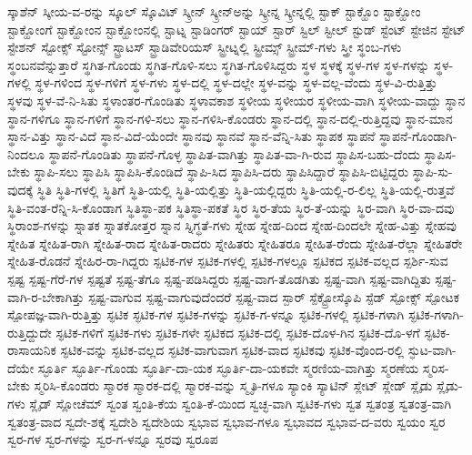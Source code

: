 {ಸ್ಕಾಶೆನ್
ಸ್ಕೀಯ-ವ-ರನ್ನು
ಸ್ಕೂಲ್
ಸ್ಕೊವಿಟ್
ಸ್ಕ್ರೀನ್
ಸ್ಕ್ರೀನ್ಅನ್ನು
ಸ್ಕ್ರೀನ್ನ
ಸ್ಕ್ರೀನ್ನಲ್ಲಿ
ಸ್ಟಾಕ್
ಸ್ಟಾಕ್ಹೊಂ
ಸ್ಟಾಕ್ಹೋಂ
ಸ್ಟಾಕ್ಹೋಂಗೆ
ಸ್ಟಾಕ್ಹೋಂನ
ಸ್ಟಾಕ್ಹೋಂನಲ್ಲಿ
ಸ್ಟಾಟ್ನ
ಸ್ಟಾಡಿಂಗರ್
ಸ್ಟಾಯ್
ಸ್ಟಾರ್
ಸ್ಟಿಲ್
ಸ್ಟೀಲ್
ಸ್ಟುಡ್
ಸ್ಟೆಂಟ್
ಸ್ಟೇಜಿನ
ಸ್ಟೇಟ್
ಸ್ಟೇಶನ್
ಸ್ಟೋಕ್ಸ್
ಸ್ಟೋನ್ಸ್
ಸ್ಟ್ರಾಟಸ್
ಸ್ಟ್ರಾಡಿವೇರಿಯಸ್
ಸ್ಟ್ರೀಟ್ನಲ್ಲಿ
ಸ್ಟ್ರೀಮ್ಸ್
ಸ್ಟ್ರೀಮ್-ಗಳು
ಸ್ತ್ರೀ
ಸ್ಥಂಬ-ಗಳು
ಸ್ಥಂಬನವೆನ್ನುತ್ತಾರೆ
ಸ್ಥಗಿತ-ಗೊಂಡು
ಸ್ಥಗಿತ-ಗೊಳಿ-ಸಲು
ಸ್ಥಗಿತ-ಗೊಳಿಸಿದ್ದರು
ಸ್ಥಳ
ಸ್ಥಳಕ್ಕೆ
ಸ್ಥಳ-ಗಳ
ಸ್ಥಳ-ಗಳನ್ನು
ಸ್ಥಳ-ಗಳಲ್ಲಿ
ಸ್ಥಳ-ಗಳಿಂದ
ಸ್ಥಳ-ಗಳಿಗೆ
ಸ್ಥಳ-ಗಳು
ಸ್ಥಳ-ದಲ್ಲಿ
ಸ್ಥಳ-ದಲ್ಲೇ
ಸ್ಥಳ-ವನ್ನು
ಸ್ಥಳ-ವಲ್ಲ-ವೆಂದು
ಸ್ಥಳ-ವಿ-ರುತ್ತಿತ್ತು
ಸ್ಥಳವು
ಸ್ಥಳ-ವೆ-ನಿ-ಸಿತು
ಸ್ಥಳಾಂತರ-ಗೊಂಡಿತು
ಸ್ಥಳಾವಕಾಶ
ಸ್ಥಳೀಯ
ಸ್ಥಳೀಯರ
ಸ್ಥಳೀಯ-ವಾಗಿ
ಸ್ಥಳೀಯ-ವಾದ್ದು
ಸ್ಥಾನ
ಸ್ಥಾನ-ಗಳಿಗೂ
ಸ್ಥಾನ-ಗಳಿಗೆ
ಸ್ಥಾನ-ಗಳಿ-ಸಲು
ಸ್ಥಾನ-ಗಳಿಸಿ-ಕೊಂಡರು
ಸ್ಥಾನ-ದಲ್ಲಿ
ಸ್ಥಾನ-ದಲ್ಲಿ-ರುತ್ತಿದ್ದವು
ಸ್ಥಾನ-ಮಾನ
ಸ್ಥಾನ-ವಿತ್ತು
ಸ್ಥಾನ-ವಿದೆ
ಸ್ಥಾನ-ವಿದೆ-ಯೆಂದೇ
ಸ್ಥಾನವು
ಸ್ಥಾನವೆ
ಸ್ಥಾನ-ವೆನ್ನಿ-ಸಿತು
ಸ್ಥಾಪಕ
ಸ್ಥಾಪನೆ
ಸ್ಥಾಪನೆ-ಗೊಂಡಾಗಿ-ನಿಂದಲೂ
ಸ್ಥಾಪನೆ-ಗೊಂಡಿತು
ಸ್ಥಾಪನೆ-ಗೊಳ್ಳ
ಸ್ಥಾಪಿತ-ವಾಗಿತ್ತು
ಸ್ಥಾಪಿತ-ವಾ-ಗಿ-ರುವ
ಸ್ಥಾಪಿಸ-ಬಹು-ದೆಂದು
ಸ್ಥಾಪಿಸ-ಬೇಕು
ಸ್ಥಾಪಿ-ಸಲು
ಸ್ಥಾಪಿಸಿ
ಸ್ಥಾಪಿಸಿ-ಕೊಂಡಿದೆ
ಸ್ಥಾಪಿ-ಸಿದ
ಸ್ಥಾಪಿಸಿ-ದರು
ಸ್ಥಾಪಿಸಿದ್ದಾರೆ
ಸ್ಥಾಪಿಸಿ-ಬಿಟ್ಟಿದ್ದರು
ಸ್ಥಾಪಿ-ಸು-ವುದಕ್ಕೆ
ಸ್ಥಿತಿ
ಸ್ಥಿತಿ-ಗಳಲ್ಲಿ
ಸ್ಥಿತಿಗೆ
ಸ್ಥಿತಿ-ಯಲ್ಲಿ
ಸ್ಥಿತಿ-ಯಲ್ಲಿತ್ತು
ಸ್ಥಿತಿ-ಯಲ್ಲಿದ್ದರು
ಸ್ಥಿತಿ-ಯಲ್ಲಿ-ರ-ಲಿಲ್ಲ
ಸ್ಥಿತಿ-ಯಲ್ಲಿ-ರುತ್ತವೆ
ಸ್ಥಿತಿ-ವಂತ-ರೆನ್ನಿ-ಸಿ-ಕೊಂಡಾಗ
ಸ್ಥಿತಿಸ್ಥಾ-ಪಕ
ಸ್ಥಿತಿಸ್ಥಾ-ಪಕತೆ
ಸ್ಥಿರ
ಸ್ಥಿರ-ತೆಯ
ಸ್ಥಿರ-ತೆ-ಯನ್ನು
ಸ್ಥಿರ-ವಾಗಿ
ಸ್ಥಿರ-ವಾ-ದವು
ಸ್ಥಿರಾಂಶ-ಗಳನ್ನು
ಸ್ನಾತಕ
ಸ್ನಾತಕೋತ್ತರ
ಸ್ನಾನ
ಸ್ನಿಗ್ಧತೆ-ಗಳು
ಸ್ನೇಹ
ಸ್ನೇಹ-ದಿಂದ
ಸ್ನೇಹ-ದಿಂದಲೇ
ಸ್ನೇಹ-ವಿತ್ತು
ಸ್ನೇಹವು
ಸ್ನೇಹಿತ
ಸ್ನೇಹಿತ-ರಾಗಿ
ಸ್ನೇಹಿತ-ರಾದ
ಸ್ನೇಹಿತ-ರಾದರು
ಸ್ನೇಹಿತರು
ಸ್ನೇಹಿತರೂ
ಸ್ನೇಹಿತ-ರೆಂದು
ಸ್ನೇಹಿತ-ರೆಲ್ಲಾ
ಸ್ನೇಹಿತರೇ
ಸ್ನೇಹಿತ-ರೊಡನೆ
ಸ್ನೇಹಿರ-ರಾ-ಗಿದ್ದರು
ಸ್ಪಟಿಕ-ಗಳ
ಸ್ಪಟಿಕ-ಗಳಲ್ಲಿ
ಸ್ಪಟಿಕ-ಗಳಲ್ಲೂ
ಸ್ಪಟಿಕದ
ಸ್ಪಟಿಕ-ವಲ್ಲದ
ಸ್ಪರ್ಶಿ-ಸುವ
ಸ್ಪಷ್ಟ
ಸ್ಪಷ್ಟ-ಗೆರೆ-ಗಳ
ಸ್ಪಷ್ಟತೆ
ಸ್ಪಷ್ಟ-ತೆಗೂ
ಸ್ಪಷ್ಟ-ಪಡಿಸಿದ್ದರು
ಸ್ಪಷ್ಟ-ವಾಗ-ತೊಡಗಿತು
ಸ್ಪಷ್ಟ-ವಾಗಿ
ಸ್ಪಷ್ಟ-ವಾಗಿದ್ದಿತು
ಸ್ಪಷ್ಟ-ವಾಗಿ-ರ-ಬೇಕಾಗಿತ್ತು
ಸ್ಪಷ್ಟ-ವಾಗುವ
ಸ್ಪಷ್ಟ-ವಾಗುವುದೆಂದರೆ
ಸ್ಪಷ್ಟ-ವಾದ
ಸ್ಪಾರ್
ಸ್ಪೆಕ್ಟ್ರೋಸ್ಕೊಪಿ
ಸ್ಪೆಡ್
ಸ್ಪೋಕ್ಸ್
ಸ್ಪೋಟಕ
ಸ್ಪೋಪಜ್ಞ-ವಾಗಿ-ರುತ್ತಿತ್ತು
ಸ್ಫಟಿಕ
ಸ್ಫಟಿಕ-ಗಳ
ಸ್ಫಟಿಕ-ಗಳನ್ನು
ಸ್ಫಟಿಕ-ಗ-ಳನ್ನೂ
ಸ್ಫಟಿಕ-ಗಳಲ್ಲಿ
ಸ್ಫಟಿಕ-ಗಳಾಗಿ
ಸ್ಫಟಿಕ-ಗಳಾಗಿ-ರುತ್ತಿದ್ದುದೇ
ಸ್ಫಟಿಕ-ಗಳಿಗೆ
ಸ್ಫಟಿಕ-ಗಳು
ಸ್ಫಟಿಕ-ಗಳೇ
ಸ್ಫಟಿಕದ
ಸ್ಫಟಿಕ-ದಲ್ಲಿ
ಸ್ಫಟಿಕ-ದೊಳ-ಗಿನ
ಸ್ಫಟಿಕ-ದೊ-ಳಗೆ
ಸ್ಫಟಿಕ-ರಾಸಾಯನಿಕ
ಸ್ಫಟಿಕ-ವನ್ನು
ಸ್ಫಟಿಕ-ವಲ್ಲದ
ಸ್ಫಟಿಕ-ವಾಗುವಾಗ
ಸ್ಫಟಿಕ-ವಾದ
ಸ್ಫಟಿಕವು
ಸ್ಫಟಿಕ-ವೊಂದ-ರಲ್ಲಿ
ಸ್ಫುಟ-ವಾಗಿ-ದೆಯೇ
ಸ್ಫೂರ್ತಿ
ಸ್ಫೂರ್ತಿ-ಗೊಂಡು
ಸ್ಫೂರ್ತಿ-ದಾ-ಯಕ
ಸ್ಫೂರ್ತಿ-ದಾ-ಯಕವೇ
ಸ್ಮರಣಿಯ-ವಾಗಿತ್ತು
ಸ್ಮರಣೆಯ
ಸ್ಮರಿಸ-ಬೇಕು
ಸ್ಮರಿಸಿ-ಕೊಂಡರು
ಸ್ಮಾರಕ
ಸ್ಮಾರಕ-ದಲ್ಲಿ
ಸ್ಮಾರಕ-ವನ್ನು
ಸ್ಮೃತಿ-ಗಳೂ
ಸ್ಯಾಂಕಿ
ಸ್ಯಾಟಿನ್
ಸ್ಲೇಟ್
ಸ್ಲೇಡ್
ಸ್ಲೈಡು
ಸ್ಲೈಡು-ಗಳು
ಸ್ಲೈಡ್
ಸ್ಲೋಚೆಮ್
ಸ್ವಂತ
ಸ್ವಂತಿ-ಕೆಯ
ಸ್ವಂತಿ-ಕೆ-ಯಿಂದ
ಸ್ವಚ್ಛ-ವಾಗಿ
ಸ್ವಟಿಕ-ಗಳು
ಸ್ವತ
ಸ್ವತಂತ್ರ
ಸ್ವತಂತ್ರ-ವಾಗಿ
ಸ್ವತಂತ್ರ-ವಾದ
ಸ್ವದೇ-ಶಕ್ಕೆ
ಸ್ವದೇಶಿ
ಸ್ವದೇಶಿಯ
ಸ್ವಭಾವ
ಸ್ವಭಾವ-ಗಳೂ
ಸ್ವಭಾವದ
ಸ್ವಭಾವ-ದ-ವರು
ಸ್ವಯಂ
ಸ್ವರ
ಸ್ವರ-ಗಳ
ಸ್ವರ-ಗಳನ್ನು
ಸ್ವರ-ಗ-ಳನ್ನೂ
ಸ್ವರವು
ಸ್ವರೂಪ
}
